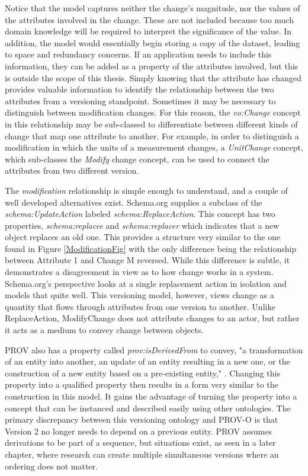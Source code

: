 Notice that the model captures neither the change's magnitude, nor the values of the attributes involved in the change.
These are not included because too much domain knowledge will be required to interpret the significance of the value.
In addition, the model would essentially begin storing a copy of the dataset, leading to space and redundancy concerns.
If an application needs to include this information, they can be added as a property of the attributes involved, but this is outside the scope of this thesis.
Simply knowing that the attribute has changed provides valuable information to identify the relationship between the two attributes from a versioning standpoint.
Sometimes it may be necessary to distinguish between modification changes.
For this reason, the \textit{vo:Change} concept in this relationship may be sub-classed to differentiate between different kinds of change that map one attribute to another.
For example, in order to distinguish a modification in which the units of a measurement changes, a \textit{UnitChange} concept, which sub-classes the \textit{Modify} change concept, can be used to connect the attributes from two different version.

The \textit{modification} relationship is simple enough to understand, and a couple of well developed alternatives exist.
Schema.org supplies a subclass of the \textit{schema:UpdateAction} labeled \textit{schema:ReplaceAction}.
This concept has two properties, \textit{schema:replacee} and \textit{schema:replacer} which indicates that a new object replaces an old one.
This provides a structure very similar to the one found in Figure \ref{ModificationFig} with the only difference being the relationship between Attribute 1 and Change M reversed.
While this difference is subtle, it demonstrates a disagreement in view as to how change works in a system.
Schema.org's perspective looks at a single replacement action in isolation and models that quite well.
This versioning model, however, views change as a quantity that flows through attributes from one version to another.
Unlike ReplaceAction, ModifyChange does not attribute changes to an actor, but rather it acts as a medium to convey change between objects.

PROV also has a property called \textit{prov:isDerivedFrom} to convey, "a transformation of an entity into another, an update of an entity resulting in a new one, or the construction of a new entity based on a pre-existing entity," \cite{Lebo2013}.
Changing this property into a qualified property then results in a form very similar to the construction in this model.
It gains the advantage of turning the property into a concept that can be instanced and described easily using other ontologies.
The primary discrepancy between this versioning ontology and PROV-O is that Version 2 no longer needs to depend on a previous entity.
PROV assumes derivations to be part of a sequence, but situations exist, as seen in a later chapter, where research can create multiple simultaneous versions where an ordering does not matter.

